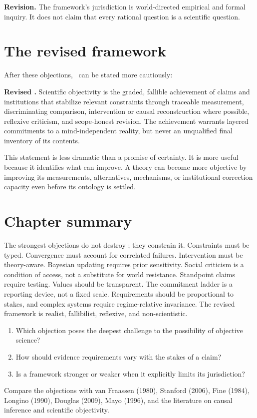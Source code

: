 \textbf{Revision.} The framework's jurisdiction is world-directed empirical
and formal inquiry. It does not claim that every rational question is a
scientific question.

\section{The revised framework}

After these objections, \RCR\ can be stated more cautiously:

\begin{principlebox}
\textbf{Revised \RCR.} Scientific objectivity is the graded, fallible
achievement of claims and institutions that stabilize relevant constraints
through traceable measurement, discriminating comparison, intervention or
causal reconstruction where possible, reflexive criticism, and scope-honest
revision. The achievement warrants layered commitments to a mind-independent
reality, but never an unqualified final inventory of its contents.
\end{principlebox}

This statement is less dramatic than a promise of certainty. It is more useful
because it identifies what can improve. A theory can become more objective by
improving its measurements, alternatives, mechanisms, or institutional
correction capacity even before its ontology is settled.

\section*{Chapter summary}

The strongest objections do not destroy \RCR; they constrain it. Constraints
must be typed. Convergence must account for correlated failures. Intervention
must be theory-aware. Bayesian updating requires prior sensitivity. Social
criticism is a condition of access, not a substitute for world resistance.
Standpoint claims require testing. Values should be transparent. The commitment
ladder is a reporting device, not a fixed scale. Requirements should be
proportional to stakes, and complex systems require regime-relative
invariance. The revised framework is realist, fallibilist, reflexive, and
non-scientistic.

\begin{discussion}
\begin{enumerate}
\item Which objection poses the deepest challenge to the possibility of
objective science?
\item How should evidence requirements vary with the stakes of a claim?
\item Is a framework stronger or weaker when it explicitly limits its
jurisdiction?
\end{enumerate}
\end{discussion}

\begin{furtherreading}
Compare the objections with van Fraassen (1980), Stanford (2006), Fine (1984),
Longino (1990), Douglas (2009), Mayo (1996), and the literature on causal
inference and scientific objectivity.
\end{furtherreading}

